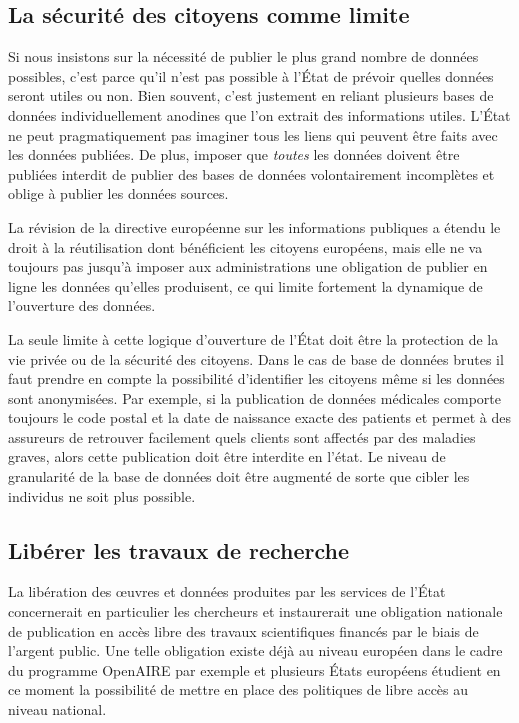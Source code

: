 \subsection{La sécurité des citoyens comme limite}
Si nous insistons sur la nécessité de publier le plus grand nombre de données possibles, c'est parce qu'il n'est pas possible à l'État de prévoir quelles données seront utiles ou non. Bien souvent, c'est justement en reliant plusieurs bases de données individuellement anodines que l'on extrait des informations utiles. L'État ne peut pragmatiquement pas imaginer tous les liens qui peuvent être faits avec les données publiées. De plus, imposer que \emph{toutes} les données doivent être publiées interdit de publier des bases de données volontairement incomplètes et oblige à publier les données sources. 

La révision de la directive européenne sur les informations publiques a étendu le droit à la réutilisation dont bénéficient les citoyens européens, mais elle ne va toujours pas jusqu'à imposer aux administrations une obligation de publier en ligne les données qu'elles produisent, ce qui limite fortement la dynamique de l'ouverture des données.


La seule limite à cette logique d'ouverture de l'État doit être la protection de la vie privée ou de la sécurité des citoyens. Dans le cas de base de données brutes il faut prendre en compte la possibilité d'identifier les citoyens même si les données sont anonymisées. Par exemple, si la publication de données médicales comporte toujours le code postal et la date de naissance exacte des patients et permet à des assureurs de retrouver facilement quels clients sont affectés par des maladies graves, alors cette publication doit être interdite en l'état. Le niveau de granularité de la base de données doit être augmenté de sorte que cibler les individus ne soit plus possible.

\subsection{Libérer les travaux de recherche}

La libération des œuvres et données produites par les services de l’État concernerait en particulier les chercheurs et instaurerait une obligation nationale de publication en accès libre des travaux scientifiques financés par le biais de l'argent public. Une telle obligation existe déjà au niveau européen dans le cadre du programme OpenAIRE par exemple et plusieurs États européens étudient en ce moment la possibilité de mettre en place des politiques de libre accès au niveau national.

